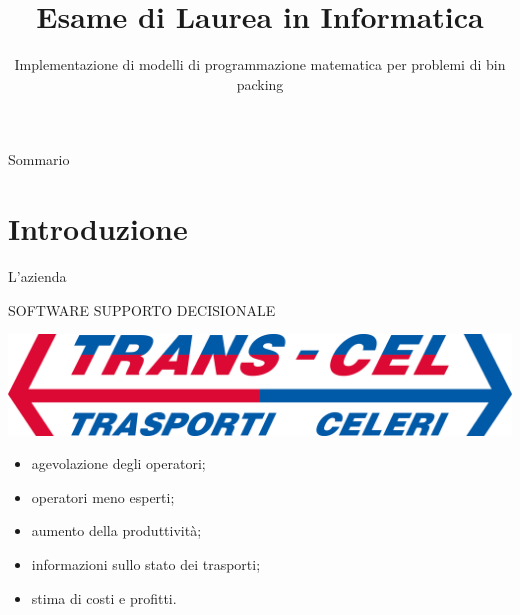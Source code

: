 \documentclass{beamer}
\title{Esame di Laurea in Informatica}
\subtitle{Implementazione di modelli di programmazione matematica per problemi di bin packing}
\author[Daniel Rossi]{%
	\usebox{\authbox}
}
\institute{Dipartimento di Matematica ''Tullio Levi Civita''}
\date{%
	\usebox{\datebox}
}
\begin{document}
\maketitle

\begin{frame}{Sommario}
	\tableofcontents
\end{frame}

\section{Introduzione}

\begin{frame}{L'azienda}
	\begin{minipage}[c]{0.45\textwidth}
		\large{\uppercase{Software supporto decisionale}}
	\end{minipage}
	\hfill
	\begin{minipage}[c]{0.45\textwidth}
		\includegraphics[width=1\linewidth]{figures/logo-transcel}
	\end{minipage}
	\vspace{1.0em}
	\begin{itemize}
		\item agevolazione degli operatori;
		\item operatori meno esperti;
		\item aumento della produttivit\`a;
		\item informazioni sullo stato dei trasporti;
		\item stima di costi e profitti.
	\end{itemize}
\end{frame}
\end{document}

